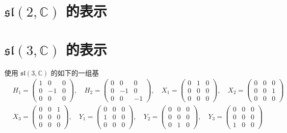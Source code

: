 \section{\texorpdfstring{\( \mathfrak{sl}(2, \mathbb{C}) \)}{sl(2, C)} 的表示}

\section{\texorpdfstring{\( \mathfrak{sl}(3, \mathbb{C}) \)}{sl(3, C)} 的表示}

使用 \( \mathfrak{sl}(3, \mathbb{C}) \) 的如下的一组基
\begin{align*}
  &H_1 = \begin{pmatrix}
    1 &0 &0\\0 &-1 &0\\0 &0 &0
  \end{pmatrix},\quad H_2 = \begin{pmatrix}
    0 &0 &0\\0 &-1 &0\\0 &0 &-1
  \end{pmatrix},\quad X_1 = \begin{pmatrix}
    0 &1 &0\\0 &0 &0\\0 &0 &0
  \end{pmatrix},\quad X_2 = \begin{pmatrix}
    0 &0 &0\\0 &0 &1\\0 &0 &0
  \end{pmatrix}\\
  &X_3 = \begin{pmatrix}
    0 &0 &1\\0 &0 &0\\0 &0 &0
  \end{pmatrix},\quad Y_1 = \begin{pmatrix}
    0 &0 &0\\1 &0 &0\\0 &0 &0
  \end{pmatrix},\quad Y_2 = \begin{pmatrix}
    0 &0 &0\\0 &0 &0\\0 &1 &0
  \end{pmatrix},\quad Y_3 = \begin{pmatrix}
    0 &0 &0\\0 &0 &0\\1 &0 &0
  \end{pmatrix}
\end{align*}

